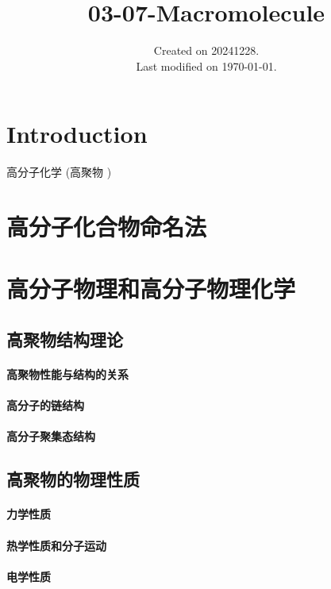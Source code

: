 \documentclass[UTF8]{../03-Chemistry}
\begin{document}
\title{03-07-Macromolecule}
\date{Created on 20241228.\\   Last modified on \today.}
\maketitle
\tableofcontents


\chapter{Introduction}


高分子化学 (高聚物 )



\chapter{高分子化合物命名法}


\chapter{高分子物理和高分子物理化学}
\section{高聚物结构理论}
    \subsubsection{高聚物性能与结构的关系}
    \subsubsection{高分子的链结构}
    \subsubsection{高分子聚集态结构}
\section{高聚物的物理性质}
    \subsubsection{力学性质}
    \subsubsection{热学性质和分子运动}
    \subsubsection{电学性质}
\end{document}
